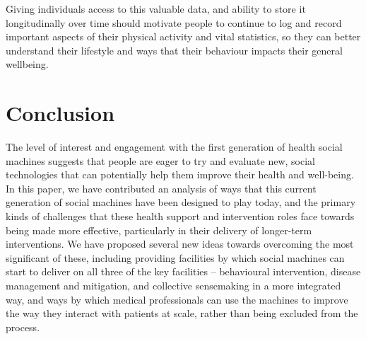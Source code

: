 \documentclass{sig-alternate}
\begin{document}
Giving individuals access to this valuable data, and ability to store
it longitudinally over time should motivate people to continue to log
and record important aspects of their physical activity and vital
statistics, so they can better understand their lifestyle and ways that
their behaviour impacts their general wellbeing.

\section{Conclusion}

The level of interest and engagement with the first generation of
health social machines suggests that people are eager to try and
evaluate new, social technologies that can potentially help them
improve their health and well-being. In this paper, we have
contributed an analysis of ways that this current generation of social
machines have been designed to play today, and the primary kinds of
challenges that these health support and intervention roles face
towards being made more effective, particularly in their delivery of
longer-term interventions. We have proposed several new ideas towards
overcoming the most significant of these, including providing
facilities by which social machines can start to deliver on all three
of the key facilities -- behavioural intervention, disease management
and mitigation, and collective sensemaking in a more integrated way,
and ways by which medical professionals can use the machines to 
improve the way they interact with patients at scale, rather than
being excluded from the process.


\end{document}
